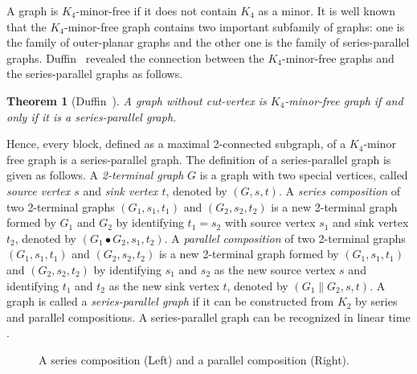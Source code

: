 \documentclass{article}
\newtheorem{thm}{Theorem}[section]
\begin{document}
A graph is $K_4$-minor-free if it does not contain $K_4$ as a minor. It is well known that the $K_4$-minor-free graph contains two important subfamily of graphs: one is the family of outer-planar graphs and the other one is the family of series-parallel graphs. Duffin~\cite{D} revealed the connection between the $K_4$-minor-free graphs and the series-parallel graphs as follows.

\begin{thm}[Duffin~\cite{D}]\label{thm:parallel}
    A graph without cut-vertex is $K_4$-minor-free graph if and only if it is a series-parallel graph. 
\end{thm}

Hence, every block, defined as a maximal 2-connected subgraph, of a $K_4$-minor free graph is a series-parallel graph. The definition of a series-parallel graph is given as follows. 
A {\em 2-terminal graph} $G$ is a graph with two special vertices, called {\em source vertex $s$} and {\em sink vertex $t$}, denoted by $(G,s,t)$. A {\em series composition} of two 2-terminal graphs $(G_1,s_1,t_1)$ and $(G_2,s_2,t_2)$ is a new 2-terminal graph formed by $G_1$ and $G_2$ by identifying $t_1=s_2$ with source vertex $s_1$ and sink vertex $t_2$, denoted by $(G_1\bullet G_2, s_1, t_2)$. A {\em parallel composition} of two 2-terminal graphs $(G_1,s_1,t_1)$ and $(G_2,s_2,t_2)$ is a new 2-terminal graph formed by $(G_1, s_1,t_1)$ and $(G_2, s_2, t_2)$ by identifying $s_1$ and $s_2$ as the new source vertex $s$ and identifying $t_1$ and $t_2$ as the new sink vertex $t$, denoted by $(G_1\|G_2, s, t)$. A  graph is called a {\em series-parallel graph} if it can be constructed from $K_2$ by series and parallel compositions. A series-parallel graph can be recognized in linear time \cite{VTL}.

\begin{figure}[!htb]
\begin{center}
\caption{A series composition (Left) and a parallel composition (Right).}\label{fig1}
\end{center}
\end{figure}   
\end{document}
